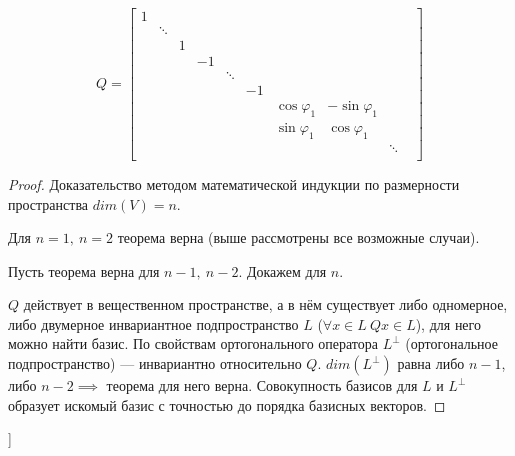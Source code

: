 $$ Q = \begin{bmatrix} 
            1 &    &   &   &   &   &   &   &   &   \\
              & \ddots  &  &   &   &   &   &   &   &   \\
              &  & 1  &    &   &   &   &   &   &   \\
              &   &   & -1 &   &   &   &   &   &   \\
              &   &   &  & \ddots &   &   &   &   \\
              &   &   &   &   & -1 &   &   &   &   \\
              &   &   &   &   &   & \cos\varphi_1 & -\sin\varphi_1 &  \\
              &   &   &   &   &   & \sin\varphi_1 & \cos\varphi_1 &  \\
              &   &   &   &   &   &   &   & \ddots\\
        \end{bmatrix} $$

\begin{proof} Доказательство методом математической индукции по размерности пространства $dim(V)=n$.

Для $n=1,~n=2$ теорема верна (выше рассмотрены все возможные случаи).

Пусть теорема верна для $n-1,~n-2$. Докажем для $n$. 

$Q$ действует в вещественном пространстве, а в нём существует либо одномерное, либо двумерное инвариантное подпространство $L$ ($\forall x \in L~Qx \in L$), для него можно найти базис. По свойствам ортогонального оператора $L^{\perp}$ (ортогональное подпространство) --- инвариантно относительно $Q$. $dim(L^{\perp})$ равна либо $n-1$, либо $n-2 \implies$ теорема для него верна. Совокупность базисов для $L$ и $L^{\perp}$ образует искомый базис с точностью до порядка базисных векторов.
\end{proof}


\bigbreak
[\cite[page 230-233, 292-295]{kim}]

